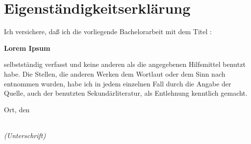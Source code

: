 \chapter{Eigenständigkeitserklärung}

\begin{large}
\vspace*{2cm}
\noindent
Ich versichere, daß ich die vorliegende Bachelorarbeit mit dem Titel :
\begin{center}
\textbf{Lorem Ipsum\\}
\end{center}

selbstständig verfasst und keine anderen als die angegebenen Hilfsmittel benutzt habe. Die Stellen, die anderen Werken dem Wortlaut oder dem Sinn nach entnommen wurden, habe ich in jedem einzelnen Fall durch die Angabe der Quelle, auch der benutzten Sekundärliteratur, als Entlehnung kenntlich gemacht.
\vspace{2cm}

\noindent
Ort, den 

\vspace{3cm}

\hspace*{7cm}%
\dotfill\\
\hspace*{8.5cm}%
\textit{(Unterschrift)}

\end{large}

\endinput
